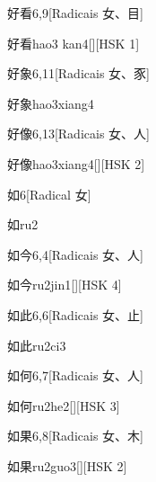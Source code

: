 \begin{entry}{好看}{6,9}[Radicais ⼥、⽬]
  \begin{phonetics}{好看}{hao3 kan4}[][HSK 1]
  \end{phonetics}
\end{entry}

\begin{entry}{好象}{6,11}[Radicais ⼥、⾗]
  \begin{phonetics}{好象}{hao3xiang4}
  \end{phonetics}
\end{entry}

\begin{entry}{好像}{6,13}[Radicais ⼥、⼈]
  \begin{phonetics}{好像}{hao3xiang4}[][HSK 2]
  \end{phonetics}
\end{entry}

\begin{entry}{如}{6}[Radical ⼥]
  \begin{phonetics}{如}{ru2}
  \end{phonetics}
\end{entry}

\begin{entry}{如今}{6,4}[Radicais ⼥、⼈]
  \begin{phonetics}{如今}{ru2jin1}[][HSK 4]
  \end{phonetics}
\end{entry}

\begin{entry}{如此}{6,6}[Radicais ⼥、⽌]
  \begin{phonetics}{如此}{ru2ci3}
  \end{phonetics}
\end{entry}

\begin{entry}{如何}{6,7}[Radicais ⼥、⼈]
  \begin{phonetics}{如何}{ru2he2}[][HSK 3]
  \end{phonetics}
\end{entry}

\begin{entry}{如果}{6,8}[Radicais ⼥、⽊]
  \begin{phonetics}{如果}{ru2guo3}[][HSK 2]
  \end{phonetics}
\end{entry}

